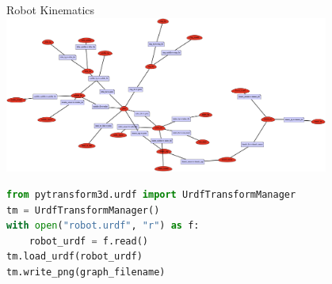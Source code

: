 \documentclass[14pt,aspectratio=169]{beamer}
\begin{document}
\begin{frame}[fragile]{Robot Kinematics}
\includegraphics[width=0.8\textwidth]{images/embodiment_graph}
\begin{lstlisting}[language=Python]
from pytransform3d.urdf import UrdfTransformManager
tm = UrdfTransformManager()
with open("robot.urdf", "r") as f:
    robot_urdf = f.read()
tm.load_urdf(robot_urdf)
tm.write_png(graph_filename)
\end{lstlisting}
\end{frame}
\end{document}
